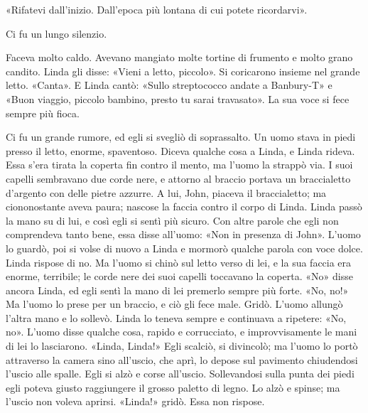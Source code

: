 \documentclass[
a5paper, %
10pt, %
twoside, 
onecolumn, %
openany, %
]{memoir}
\begin{document}
«Rifatevi dall’inizio. Dall’epoca più lontana di cui potete ricordarvi».

Ci fu un lungo silenzio.

Faceva molto caldo. Avevano mangiato molte tortine di frumento e molto grano candito. Linda gli disse: «Vieni a letto, piccolo». Si coricarono insieme nel grande letto. «Canta». E Linda cantò: «Sullo streptococco andate a Banbury-T» e «Buon viaggio, piccolo bambino, presto tu sarai travasato». La sua voce si fece sempre più fioca.

Ci fu un grande rumore, ed egli si svegliò di soprassalto. Un uomo stava in piedi presso il letto, enorme, spaventoso. Diceva qualche cosa a Linda, e Linda rideva. Essa s’era tirata la coperta fin contro il mento, ma l’uomo la strappò via. I suoi capelli sembravano due corde nere, e attorno al braccio portava un braccialetto d’argento con delle pietre azzurre. A lui, John, piaceva il braccialetto; ma ciononostante aveva paura; nascose la faccia contro il corpo di Linda. Linda passò la mano su di lui, e così egli si sentì più sicuro. Con altre parole che egli non comprendeva tanto bene, essa disse all’uomo: «Non in presenza di John». L’uomo lo guardò, poi si volse di nuovo a Linda e mormorò qualche parola con voce dolce. Linda rispose di no. Ma l’uomo si chinò sul letto verso di lei, e la sua faccia era enorme, terribile; le corde nere dei suoi capelli toccavano la coperta. «No» disse ancora Linda, ed egli sentì la mano di lei premerlo sempre più forte. «No, no!» Ma l’uomo lo prese per un braccio, e ciò gli fece male. Gridò. L’uomo allungò l’altra mano e lo sollevò. Linda lo teneva sempre e continuava a ripetere: «No, no». L’uomo disse qualche cosa, rapido e corrucciato, e improvvisamente le mani di lei lo lasciarono. «Linda, Linda!» Egli scalciò, si divincolò; ma l’uomo lo portò attraverso la camera sino all’uscio, che aprì, lo depose sul pavimento chiudendosi l’uscio alle spalle. Egli si alzò e corse all’uscio. Sollevandosi sulla punta dei piedi egli poteva giusto raggiungere il grosso paletto di legno. Lo alzò e spinse; ma l’uscio non voleva aprirsi. «Linda!» gridò. Essa non rispose.
\end{document}
